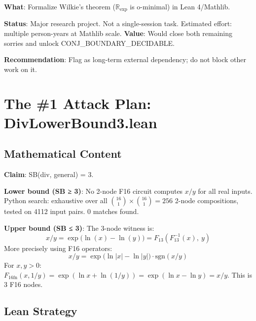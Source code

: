 \documentclass[12pt]{article}
\theoremstyle{definition}
\begin{document}
\textbf{What}: Formalize Wilkie's theorem ($\mathbb{R}_{\exp}$ is o-minimal) in Lean 4/Mathlib.

\textbf{Status}: Major research project. Not a single-session task.
Estimated effort: multiple person-years at Mathlib scale.
\textbf{Value}: Would close both remaining sorries and unlock CONJ\_BOUNDARY\_DECIDABLE.

\textbf{Recommendation}: Flag as long-term external dependency; do not block other work on it.

\section{The \#1 Attack Plan: DivLowerBound3.lean}

\subsection{Mathematical Content}

\textbf{Claim}: SB(div, general) = 3.

\textbf{Lower bound (SB ≥ 3)}: No 2-node F16 circuit computes $x/y$ for all real inputs.
Python search: exhaustive over all $\binom{16}{1} \times \binom{16}{1} = 256$ 2-node
compositions, tested on 4112 input pairs. 0 matches found.

\textbf{Upper bound (SB ≤ 3)}: The 3-node witness is:
\[
  x / y = \exp\bigl(\ln(x) - \ln(y)\bigr) = F_{13}(F_{13}^{-1}(x),\ y)
\]
More precisely using F16 operators:
\[
  x / y = \exp\bigl(\ln\lvert x\rvert - \ln\lvert y\rvert\bigr) \cdot \mathrm{sgn}(x/y)
\]
For $x, y > 0$: $F_{16\text{fn}}(x, 1/y) = \exp(\ln x + \ln(1/y)) = \exp(\ln x - \ln y) = x/y$.
This is 3 F16 nodes.

\subsection{Lean Strategy}
\end{document}
